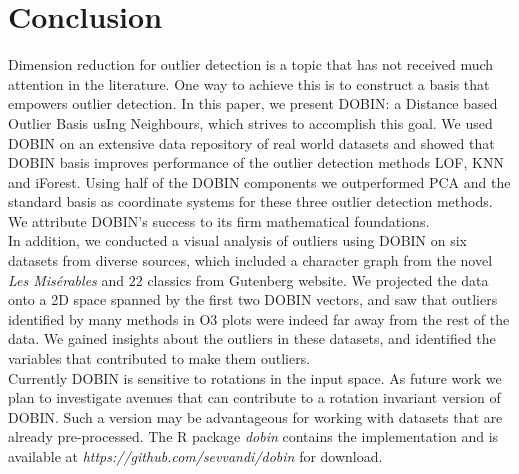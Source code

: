 \documentclass[11pt]{article}
\begin{document}
\section{Conclusion}
Dimension reduction for outlier detection is a topic that has not received much attention in the literature. One way to achieve this is to construct a basis that empowers outlier detection. In this paper, we present DOBIN: a Distance based Outlier Basis usIng Neighbours, which strives to accomplish this goal. We used DOBIN on an extensive data repository of real world datasets and showed that DOBIN basis improves performance of the outlier detection methods LOF, KNN and iForest. Using half of the DOBIN components we outperformed PCA and the standard basis as coordinate systems for these three outlier detection methods. We attribute DOBIN's success to its firm mathematical foundations. \\

In addition, we conducted a visual analysis of outliers using DOBIN on six datasets from diverse sources, which included a character graph from the novel  \textit{Les Mis\'erables} and $22$ classics from Gutenberg website. We projected the data onto a 2D space spanned by the first two DOBIN vectors, and saw that outliers identified by many methods in O3 plots were indeed far away from the rest of the data.  We gained insights about the outliers in these datasets, and identified the variables that contributed to make them outliers.  \\

Currently DOBIN is sensitive to rotations in the input space. As future work we plan to investigate avenues that can contribute to a rotation invariant version of DOBIN. Such a version may be advantageous for working with datasets that are already pre-processed. The R package \textit{dobin} contains the implementation and is available at \textit{https://github.com/sevvandi/dobin} for download. 


\end{document}
